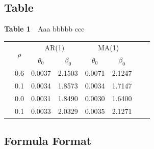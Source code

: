\documentclass{jssc}
\begin{document}
\newpage
\subsection{Table}

\begin{center}\setlength{\tabcolsep}{5pt}  %
\renewcommand{\arraystretch}{1.0}%
{\small
    \begin{center}
    \centerline{\small {\bf Table 1}~~Aaa bbbbb ccc}\vskip 1mm
    \label{Tab:MSE}

    {\small
    \begin{tabular*}{6.5cm}{cccccccc}
        \hline
        &\multirow{2}{*}{$\rho$}   &\multicolumn{2}{c}{AR(1)} &   \multicolumn{2}{c}{MA(1)} &    \\

\cmidrule(r){3-4}\cmidrule(r){5-6}
                 &           & $\theta_{0}$ & $\beta_{0}$ & $\theta_{0}$ & $\beta_{0}$   \\
        \hline
            &0.6   &0.0037    &2.1503    &0.0071    &2.1247   \\
            &0.1   &0.0034    &1.8573    &0.0034    &1.7147   \\
            & 0.0   &0.0031    &1.8490    &0.0030    &1.6400   \\
            & 0.1   &0.0033    &2.0329    &0.0035    &2.1271   \\
      \hline
    \end{tabular*}}
\end{center}}
\end{center}



\subsection{Formula Format}
\end{document}
